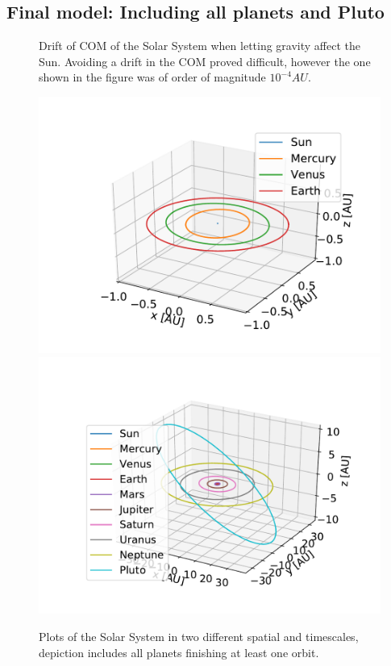 \documentclass{emulateapj}
\begin{document}
\subsection{Final model: Including all planets and Pluto}

\begin{figure}[t]
\mbox{}
\caption{Drift of COM of the Solar System when letting gravity affect the Sun. Avoiding a drift in the COM proved difficult, however the one shown in the figure was of order of magnitude $10^{-4}AU$.}
\label{fig:3f_zoom}
\end{figure}


\begin{figure}[H]
{{\includegraphics[scale=0.53]{inner3planets.pdf}}
}\qquad
{{\includegraphics[scale=0.53]{solsys_full.pdf}}
}\qquad
\caption{Plots of the Solar System in two different spatial and timescales, depiction includes all planets finishing at least one orbit.}
\label{fig:solsys}
\end{figure}
\end{document}
